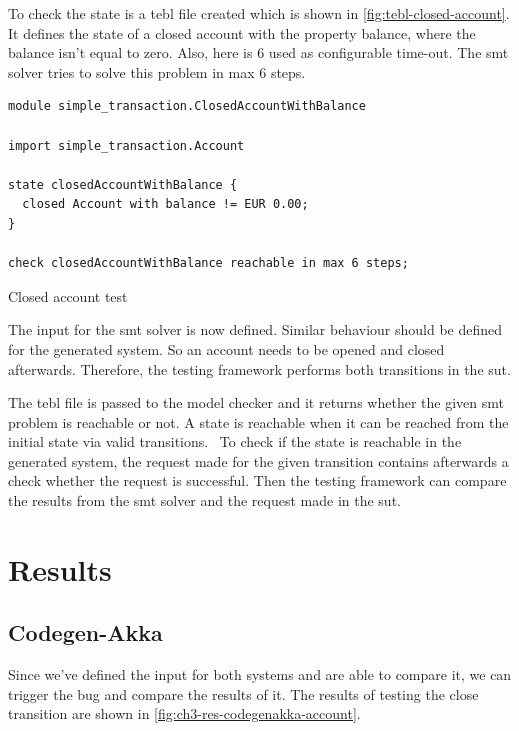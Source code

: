 To check the state is a tebl file created which is shown in
\autoref{fig:tebl-closed-account}. It defines the state of a closed account with
the property balance, where the balance isn't equal to zero. Also, here is 6
used as configurable time-out. The \gls{smt} solver tries to solve this problem in
max 6 steps.

\begin{sourcecode}[h!]
\begin{lstlisting}[]
module simple_transaction.ClosedAccountWithBalance

import simple_transaction.Account

state closedAccountWithBalance {
  closed Account with balance != EUR 0.00;
}

check closedAccountWithBalance reachable in max 6 steps;
\end{lstlisting}
\caption{Closed account test}\label{fig:tebl-closed-account}
\end{sourcecode}
\FloatBarrier

The input for the \gls{smt} solver is now defined. Similar behaviour should be defined
for the generated system. So an account needs to be opened and closed
afterwards. Therefore, the testing framework performs both transitions in the
\gls{sut}.

The tebl file is passed to the model checker and it returns whether the given
\gls{smt} problem is reachable or not. A state is reachable when it can be reached
from the initial state via valid
transitions.~\cite[p.~4]{stoel_storm_vinju_bosman_2016} To check if the state is
reachable in the generated system, the request made for the given transition
contains afterwards a check whether the request is successful. Then the testing
framework can compare the results from the \gls{smt} solver and the request made in
the \gls{sut}.

\section{Results}

\subsection{Codegen-Akka}

Since we've defined the input for both systems and are able to compare it, we
can trigger the bug and compare the results of it. The results of testing the
close transition are shown in \autoref{fig:ch3-res-codegenakka-account}.

